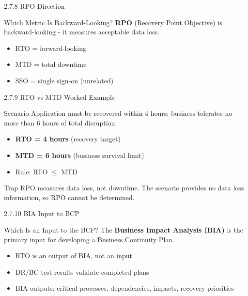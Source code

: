 \documentclass{beamer}
\begin{document}
	\begin{frame}{2.7.8 RPO Direction}
		\begin{block}{Which Metric Is Backward-Looking?}
			\textbf{RPO} (Recovery Point Objective) is backward-looking - it measures acceptable data loss.
		\end{block}
		\begin{itemize}
			\item RTO = forward-looking
			\item MTD = total downtime
			\item SSO = single sign-on (unrelated)
		\end{itemize}
	\end{frame}
	
	\begin{frame}{2.7.9 RTO vs MTD Worked Example}
		\begin{block}{Scenario}
			Application must be recovered within 4 hours; business tolerates no more than 6 hours of total disruption.
		\end{block}
		\begin{itemize}
			\item \textbf{RTO = 4 hours} (recovery target)
			\item \textbf{MTD = 6 hours} (business survival limit)
			\item Rule: RTO $\le$ MTD
		\end{itemize}
		\begin{alertblock}{Trap}
			RPO measures data loss, not downtime. The scenario provides no data loss information, so RPO cannot be determined.
		\end{alertblock}
	\end{frame}
	
	\begin{frame}{2.7.10 BIA Input to BCP}
		\begin{block}{Which Is an Input to the BCP?}
			The \textbf{Business Impact Analysis (BIA)} is the primary input for developing a Business Continuity Plan.
		\end{block}
		\begin{itemize}
			\item RTO is an output of BIA, not an input
			\item DR/BC test results validate completed plans
			\item BIA outputs: critical processes, dependencies, impacts, recovery priorities
		\end{itemize}
	\end{frame}
	
\end{document}
